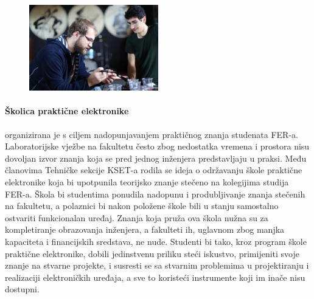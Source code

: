 \documentclass[12pt,a4paper,oneside]{article}
\begin{document}
		\begin{figure}
			\vspace{-9mm}
			\begin{flushright}
				\includegraphics[width=0.5\textwidth]{elektronika.jpg}
			\end{flushright}
			\vspace{-10mm}
		\end{figure}	
	
	\paragraph{Školica praktične elektronike}organizirana je s ciljem nadopunjavanjem praktičnog znanja studenata FER-a. Laboratorijske vježbe na fakultetu često zbog nedostatka vremena i prostora nisu dovoljan izvor znanja koja se pred jednog inženjera predstavljaju u praksi. 
	Među članovima Tehničke sekcije KSET-a rodila se ideja o održavanju škole praktične elektronike koja bi upotpunila teorijsko znanje stečeno na kolegijima studija FER-a. Škola bi studentima ponudila nadopunu i produbljivanje znanja stečenih na fakultetu, a polaznici bi nakon položene škole bili u stanju samostalno ostvariti funkcionalan uređaj. Znanja koja pruža ova škola nužna su za kompletiranje obrazovanja inženjera, a fakulteti ih, uglavnom zbog manjka kapaciteta i financijskih sredstava, ne nude. Studenti bi tako, kroz program škole praktične elektronike, dobili jedinstvenu priliku steći iskustvo, primijeniti svoje znanje na stvarne projekte, i susresti se sa stvarnim problemima u projektiranju i realizaciji elektroničkih uređaja, a sve to koristeći instrumente koji im inače nisu dostupni.
	
\end{document}
